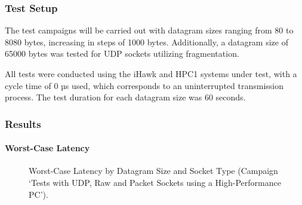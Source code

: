 \subsubsection{Test Setup}
The test campaigns will be carried out with datagram sizes ranging from 80 to 8080 bytes, increasing in steps of 1000 bytes. Additionally, a datagram size of 65000 bytes was tested for UDP sockets utilizing fragmentation.

All tests were conducted using the iHawk and HPC1 systems under test, with a cycle time of 0 µs used, which corresponds to an uninterrupted transmission process. The test duration for each datagram size was 60 seconds.

\subsubsection{Results}
\paragraph{Worst-Case Latency}

\begin{figure}[h!]
  \centering
  \caption{Worst-Case Latency by Datagram Size and Socket Type (Campaign `Tests with UDP, Raw and Packet Sockets using a High-Performance PC').}
  \label{fig:SockTypeWc}
\end{figure}

